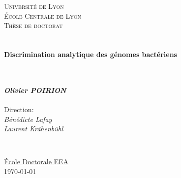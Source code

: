 \documentclass[11pt, a4paper, twoside]{Thesis} %
\renewcommand{\ttitle}{Discrimination analytique des génomes bactériens}
\renewcommand{\univname}{École Centrale de Lyon}
\renewcommand{\degreename}{Docteur en ingénierie du vivant}
\begin{document}
\begin{titlepage}

\begin{center}
\textsc{\LARGE Université de Lyon}\\[0.2cm]
\textsc{\LARGE \univname}\\[1.5cm] %
\textsc{\Large Thèse de doctorat}\\[0.5cm] %

\HRule\\[-0.4cm]\HRule\\[0.4cm] %
{\huge \bfseries \ttitle}\\[0.4cm] %
\HRule\\[-0.4cm]\HRule\\[1.5cm] %
\begin{center}
\begin{minipage}{0.5\textwidth}
\large
\emph{\textbf{\Large Olivier POIRION}}\\\\
\textnormal{Direction:}\\
\emph{\textnormal{Bénédicte Lafay}} \\
\emph{\textnormal{Laurent Krähenbühl}}\\
\end{minipage}\\[3cm]
\end{center}
\deptname
\href{http://edeea.ec-lyon.fr/}{École Doctorale EEA}\\[2cm] %
 
{\large \today}\\[4cm] %
\end{center}

\end{titlepage}
\clearpage
\clearpage

\end{document}
